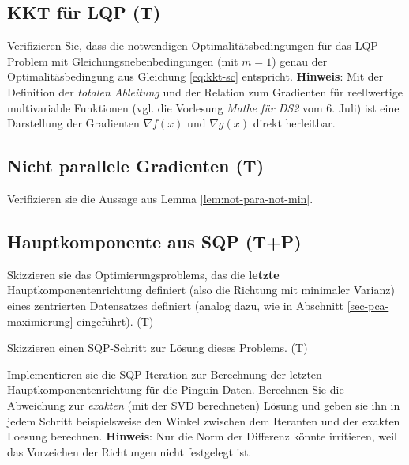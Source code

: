 \documentclass[]{book}
\theoremstyle{definition}
\theoremstyle{definition}
\theoremstyle{definition}
\theoremstyle{definition}
\theoremstyle{remark}
\begin{document}
\hypertarget{kkt-fuxfcr-lqp-t}{%
\subsection{KKT für LQP (T)}\label{kkt-fuxfcr-lqp-t}}

Verifizieren Sie, dass die notwendigen Optimalitätsbedingungen für das LQP Problem mit Gleichungsnebenbedingungen (mit \(m=1\)) genau der Optimalitäsbedingung aus Gleichung \eqref{eq:kkt-sc} entspricht. \textbf{Hinweis}: Mit der Definition der \emph{totalen Ableitung} und der Relation zum Gradienten für reellwertige multivariable Funktionen (vgl. die Vorlesung \emph{Mathe für DS2} vom 6. Juli) ist eine Darstellung der Gradienten \(\nabla f(x)\) und \(\nabla g(x)\) direkt herleitbar.

\hypertarget{nicht-parallele-gradienten-t}{%
\subsection{Nicht parallele Gradienten (T)}\label{nicht-parallele-gradienten-t}}

Verifizieren sie die Aussage aus Lemma \ref{lem:not-para-not-min}.

\hypertarget{hauptkomponente-aus-sqp-tp}{%
\subsection{Hauptkomponente aus SQP (T+P)}\label{hauptkomponente-aus-sqp-tp}}

Skizzieren sie das Optimierungsproblems, das die \textbf{letzte} Hauptkomponentenrichtung definiert (also die Richtung mit minimaler Varianz) eines zentrierten Datensatzes definiert (analog dazu, wie in Abschnitt \ref{sec-pca-maximierung} eingeführt). (T)

Skizzieren einen SQP-Schritt zur Lösung dieses Problems. (T)

Implementieren sie die SQP Iteration zur Berechnung der letzten Hauptkomponentenrichtung für die Pinguin Daten. Berechnen Sie die Abweichung zur \emph{exakten} (mit der SVD berechneten) Lösung und geben sie ihn in jedem Schritt beispielsweise den Winkel zwischen dem Iteranten und der exakten Loesung berechnen. \textbf{Hinweis}: Nur die Norm der Differenz könnte irritieren, weil das Vorzeichen der Richtungen nicht festgelegt ist.
\end{document}
